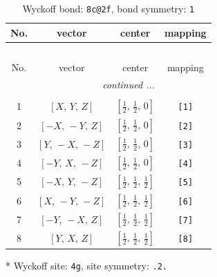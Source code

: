 \documentclass[fleqn,8pt]{jsarticle}
\begin{document}
\begin{longtable}{cccc}
\caption{Wyckoff bond: {\tt 8c@2f}, bond symmetry: {\tt 1}}
 \\
 \hline \hline
No. & vector & center & mapping \\ \hline \endfirsthead

\multicolumn{3}{l}{\tablename\ \thetable{}} \\
 \hline \hline
No. & vector & center & mapping \\ \hline \endhead

 \hline \hline
\multicolumn{3}{r}{\footnotesize\it continued ...} \\ \endfoot

 \hline \hline
\multicolumn{3}{r}{} \\ \endlastfoot

1 & $\left[ X,\, Y,\, Z \right]$ & $\left[ \frac{1}{2},\, \frac{1}{2},\, 0 \right]$ & {\tt [1]} \\ \hline
2 & $\left[ - X,\, - Y,\, Z \right]$ & $\left[ \frac{1}{2},\, \frac{1}{2},\, 0 \right]$ & {\tt [2]} \\ \hline
3 & $\left[ Y,\, - X,\, - Z \right]$ & $\left[ \frac{1}{2},\, \frac{1}{2},\, 0 \right]$ & {\tt [3]} \\ \hline
4 & $\left[ - Y,\, X,\, - Z \right]$ & $\left[ \frac{1}{2},\, \frac{1}{2},\, 0 \right]$ & {\tt [4]} \\ \hline
5 & $\left[ - X,\, Y,\, - Z \right]$ & $\left[ \frac{1}{2},\, \frac{1}{2},\, \frac{1}{2} \right]$ & {\tt [5]} \\ \hline
6 & $\left[ X,\, - Y,\, - Z \right]$ & $\left[ \frac{1}{2},\, \frac{1}{2},\, \frac{1}{2} \right]$ & {\tt [6]} \\ \hline
7 & $\left[ - Y,\, - X,\, Z \right]$ & $\left[ \frac{1}{2},\, \frac{1}{2},\, \frac{1}{2} \right]$ & {\tt [7]} \\ \hline
8 & $\left[ Y,\, X,\, Z \right]$ & $\left[ \frac{1}{2},\, \frac{1}{2},\, \frac{1}{2} \right]$ & {\tt [8]} \\
\end{longtable}
* Wyckoff site: {\tt 4g}, site symmetry: {\tt .2.}
\renewcommand{\arraystretch}{1.2}
\end{document}
